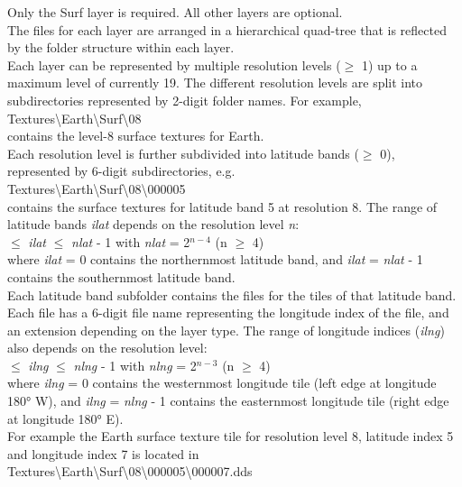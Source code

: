 \documentclass[Orbiter Developer Manual.tex]{subfiles}
\begin{document}
\noindent
Only the Surf layer is required. All other layers are optional.\\
The files for each layer are arranged in a hierarchical quad-tree that is reflected by the folder structure within each layer.\\
Each layer can be represented by multiple resolution levels ($\geq$ 1) up to a maximum level of currently 19. The different resolution levels are split into subdirectories represented by 2-digit folder names. For example,\\
\indent Textures\textbackslash Earth\textbackslash Surf\textbackslash 08\\
contains the level-8 surface textures for Earth.\\
Each resolution level is further subdivided into latitude bands ($\geq$ 0), represented by 6-digit subdirectories, e.g.\\
\indent Textures\textbackslash Earth\textbackslash Surf\textbackslash 08\textbackslash 000005\\
contains the surface textures for latitude band 5 at resolution 8. The range of latitude bands \textit{ilat} depends on the resolution level \textit{n}:\\
 $\leq$ \textit{ilat} $\leq$ \textit{nlat} - 1  with  \textit{nlat} = 2$^{n-4}$  (n $\geq$ 4)\\
where \textit{ilat} = 0 contains the northernmost latitude band, and \textit{ilat} = \textit{nlat} - 1 contains the southernmost latitude band.\\
Each latitude band subfolder contains the files for the tiles of that latitude band. Each file has a 6-digit file name representing the longitude index of the file, and an extension depending on the layer type. The range of longitude indices (\textit{ilng}) also depends on the resolution level:\\
 $\leq$ \textit{ilng} $\leq$ \textit{nlng} - 1  with  \textit{nlng} = 2$^{n-3}$  (n $\geq$ 4)\\
where \textit{ilng} = 0 contains the westernmost longitude tile (left edge at longitude 180° W), and \textit{ilng} = \textit{nlng} - 1 contains the easternmost longitude tile (right edge at longitude 180° E).\\
For example the Earth surface texture tile for resolution level 8, latitude index 5 and longitude index 7 is located in\\
\indent Textures\textbackslash Earth\textbackslash Surf\textbackslash 08\textbackslash 000005\textbackslash 000007.dds
\end{document}
